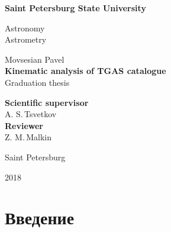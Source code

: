 \documentclass[14pt]{article} %
\begin{document}
\begin{titlepage}

\begin{center}
{\small \bf Saint Petersburg State University

Astronomy\\Astrometry}
\end{center}

\vspace{2cm}
\begin{center}
Movsesian Pavel\\
  \large{\bf Kinematic analysis of TGAS catalogue}\\
Graduation thesis
 \end{center}

\vspace{3cm}

\hspace{8cm}\parbox{8cm}{	%

\footnotesize{{\bf Scientific supervisor}\\
A. S.\,Tsvetkov} \\  %

{\bf Reviewer}\\
Z. M.\,Malkin \\  %
}

\vfill %

\begin{center}
\small {Saint Petersburg

2018}
\end{center}

\end{titlepage}

\tableofcontents
\newpage

\section{Введение}
\end{document}
